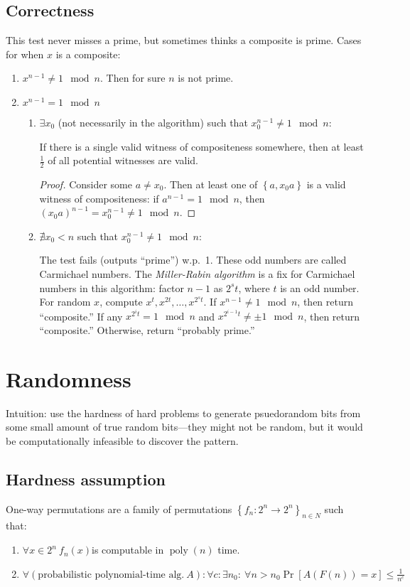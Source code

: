 \subsection{Correctness}
This test never misses a prime, but sometimes thinks a composite is prime. Cases for when \(x\) is a composite:
\begin{enumerate}
	\item \(x^{n - 1} \neq 1 \mod n\). Then for sure \(n\) is not prime.
	\item \(x^{n - 1} = 1 \mod n\)
	\begin{enumerate}
		\item \(\exists x_0\) (not necessarily in the algorithm) such that \(x_0^{n - 1} \neq 1\mod n\):
		
		If there is a single valid witness of compositeness somewhere, then at least \(\frac{1}{2}\) of all potential witnesses are valid.
		\begin{proof}
			Consider some \(a \neq x_0\). Then at least one of \(\left\{a, x_0a\right\}\) is a valid witness of compositeness: if \(a^{n - 1} = 1\mod n\), then \(\left(x_0a\right)^{n - 1} = x_0^{n - 1} \neq 1 \mod n\).
		\end{proof}
		\item \(\nexists x_0 < n\) such that \(x_0^{n - 1} \neq 1\mod n\):
		
		The test fails (outputs ``prime'') w.p.~1. These odd numbers are called Carmichael numbers.
		The \emph{Miller-Rabin algorithm} is a fix for Carmichael numbers in this algorithm: factor \(n - 1\) as \(2^st\),
		where \(t\) is an odd number. For random \(x\), compute \(x^t, x^{2t}, \ldots, x^{2^st}\).
		If \(x^{n - 1} \neq 1\mod n\), then return ``composite.''
		If any \(x^{2^it} = 1 \mod n\) and \(x^{2^{i - 1}t}\neq \pm 1\mod n\), then return ``composite.''
		Otherwise, return ``probably prime.''
	\end{enumerate}
\end{enumerate}

\section{Randomness}
Intuition: use the hardness of hard problems to generate psuedorandom bits from some small amount of true random bits---they might not be random, but it would be computationally infeasible to discover the pattern.
\subsection{Hardness assumption}
One-way permutations are a family of permutations \(\left\{f_n : 2^n \to 2^n\right\}_{n\in N}\) such that:
\begin{enumerate}
	\item \(\forall x\in 2^n\ f_n(x)\)is computable in \(\operatorname{poly}(n)\) time.
	\item \(\forall \left(\text{probabilistic polynomial-time alg.}\ A\right): \forall c: \exists n_0:\ \forall n>n_0 \Pr\left[A(F(n)) = x\right] \leq \frac{1}{n^c}\)
\end{enumerate}